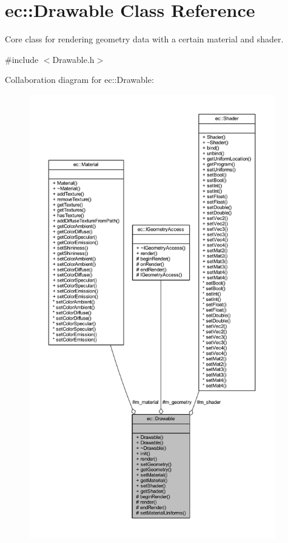 \hypertarget{classec_1_1_drawable}{}\section{ec\+:\+:Drawable Class Reference}
\label{classec_1_1_drawable}


Core class for rendering geometry data with a certain material and shader.  




{\ttfamily \#include $<$Drawable.\+h$>$}



Collaboration diagram for ec\+:\+:Drawable\+:\nopagebreak
\begin{figure}[H]
\begin{center}
\leavevmode
\includegraphics[height=550pt]{classec_1_1_drawable__coll__graph}
\end{center}
\end{figure}
